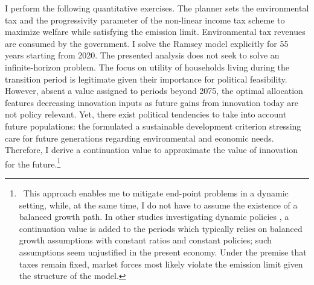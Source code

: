 I perform the following quantitative exercises. 
 The planner sets the environmental tax and the progressivity parameter of the non-linear income tax scheme to maximize welfare while satisfying the emission limit. Environmental tax revenues are consumed by the government. %
I solve the Ramsey model explicitly for 55 years starting from 2020. The presented analysis does not seek to solve an infinite-horizon problem. The focus on utility of households living during the transition period is legitimate given their importance for political feasibility.
However, absent a value assigned to periods beyond 2075, the optimal allocation features decreasing innovation inputs as future gains from innovation today are not policy relevant.
Yet, there exist political tendencies to take into account future populations:  the \cite{UNSUS} formulated a sustainable development criterion stressing care for future generations regarding environmental and economic needs. 
Therefore, I derive a continuation value to approximate the value of innovation for the future.\footnote{\ This approach enables me to mitigate end-point problems in a dynamic setting, while, at the same time, I do not have to assume the existence of a balanced growth path. 
 In other studies investigating dynamic policies \citep{Jones1993OptimalGrowth, Barrage2019OptimalPolicy}, %
a continuation value is added to the periods which typically relies on balanced growth assumptions with constant ratios and constant policies; such assumptions seem unjustified  in the present economy.
Under the premise that taxes remain fixed, market forces most likely violate the emission limit given the structure of the model. }

